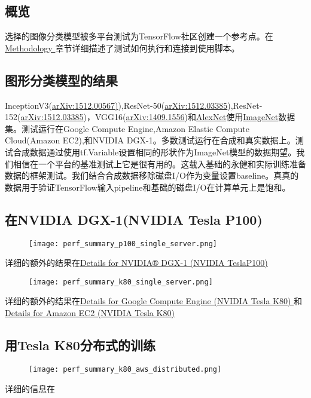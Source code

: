 \subsection{概览}
选择的图像分类模型被多平台测试为TensorFlow社区创建一个参考点。在\href{https://www.tensorflow.org/performance/benchmarks#methodology}{Methodology }章节详细描述了测试如何执行和连接到使用脚本。
\subsection{图形分类模型的结果}
InceptionV3(\href{https://arxiv.org/abs/1512.00567}{arXiv:1512.00567)}),ResNet-50(\href{https://arxiv.org/abs/1512.03385}{arXiv:1512.03385}),ResNet-152(\href{https://arxiv.org/abs/1512.03385}{arXiv:1512.03385})，VGG16(\href{https://arxiv.org/abs/1409.1556}{arXiv:1409.1556})和\href{http://papers.nips.cc/paper/4824-imagenet-classification-with-deep-convolutional-neural-networks.pdf}{AlexNet}使用\href{http://www.image-net.org/}{ImageNet}数据集。测试运行在Google Compute Engine,Amazon Elastic Compute Cloud(Amazon EC2),和NVIDIA DGX-1。多数测试运行在合成和真实数据上。测试合成数据通过使用tf.Variable设置相同的形状作为ImageNet模型的数据期望。我们相信在一个平台的基准测试上它是很有用的。这载入基础的永健和实际训练准备数据的框架测试。我们结合合成数据移除磁盘I/O作为变量设置baseline。真真的数据用于验证TensorFlow输入pipeline和基础的磁盘I/O在计算单元上是饱和。
\subsection{在NVIDIA DGX-1(NVIDIA Tesla P100)}
\begin{figure}[H]
	\centering
	\texttt{[image: perf\_summary\_p100\_single\_server.png]}
\end{figure}
详细的额外的结果在\href{https://www.tensorflow.org/performance/benchmarks#details_for_nvidia_dgx-1tm_nvidia_tesla_p100}{Details for NVIDIA® DGX-1 (NVIDIA TeslaP100)}
\begin{figure}[H]
	\centering
	\texttt{[image: perf\_summary\_k80\_single\_server.png]}
\end{figure}
详细的额外的结果在\href{https://www.tensorflow.org/performance/benchmarks#details_for_google_compute_engine_nvidia_tesla_k80}{Details for Google Compute Engine (NVIDIA Tesla K80) }和\href{https://www.tensorflow.org/performance/benchmarks#details_for_amazon_ec2_nvidia_tesla_k80}{ Details for Amazon EC2 (NVIDIA Tesla K80) }
\subsection{用Tesla K80分布式的训练}
\begin{figure}[H]
	\centering
	\texttt{[image: perf\_summary\_k80\_aws\_distributed.png]}
\end{figure}
详细的信息在
